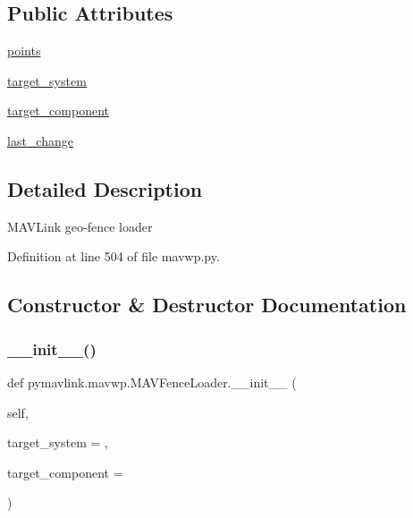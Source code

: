 \subsection*{Public Attributes}
\begin{DoxyCompactItemize}
\item 
\mbox{\hyperlink{classpymavlink_1_1mavwp_1_1MAVFenceLoader_a280180d0d631199133ba120b55fc74ee}{points}}
\item 
\mbox{\hyperlink{classpymavlink_1_1mavwp_1_1MAVFenceLoader_ad95b9bdad05fdf89e63f52ffd2c8aa87}{target\+\_\+system}}
\item 
\mbox{\hyperlink{classpymavlink_1_1mavwp_1_1MAVFenceLoader_a38751985c2a37046971dcd69a83b8370}{target\+\_\+component}}
\item 
\mbox{\hyperlink{classpymavlink_1_1mavwp_1_1MAVFenceLoader_a9d2edef837016a734557e430f25b3158}{last\+\_\+change}}
\end{DoxyCompactItemize}


\subsection{Detailed Description}
\begin{DoxyVerb}MAVLink geo-fence loader\end{DoxyVerb}
 

Definition at line 504 of file mavwp.\+py.



\subsection{Constructor \& Destructor Documentation}
\mbox{\label{classpymavlink_1_1mavwp_1_1MAVFenceLoader_ad2c36ce95b96d8ccb0d182254b64a75a}} 
\subsubsection{\texorpdfstring{\_\_init\_\_()}{\_\_init\_\_()}}
{\footnotesize\ttfamily def pymavlink.\+mavwp.\+M\+A\+V\+Fence\+Loader.\+\_\+\+\_\+init\+\_\+\+\_\+ (\begin{DoxyParamCaption}\item[{}]{self,  }\item[{}]{target\+\_\+system = {},  }\item[{}]{target\+\_\+component = {} }\end{DoxyParamCaption})}




